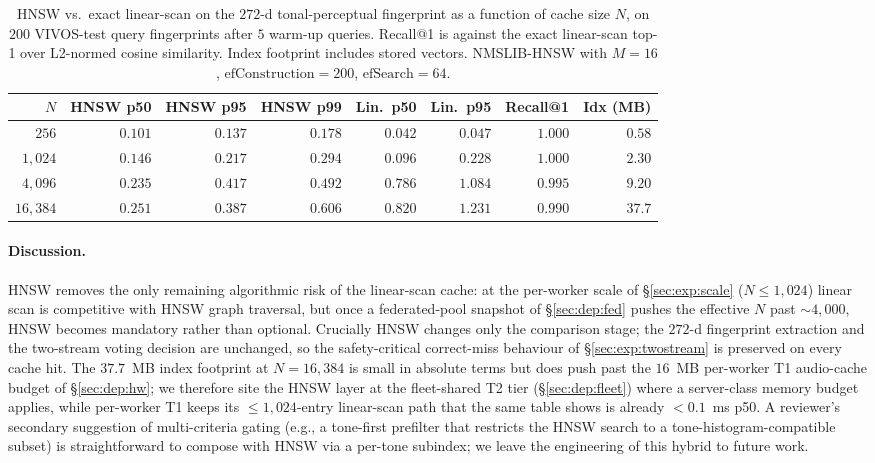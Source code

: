 \documentclass[a4paper,fleqn]{cas-dc}
\begin{document}
\begin{table}[h]
\caption{HNSW vs.\ exact linear-scan on the $272$-d tonal-perceptual fingerprint as a function of cache size $N$, on $200$ VIVOS-test query fingerprints after $5$ warm-up queries. Recall@1 is against the exact linear-scan top-1 over L2-normed cosine similarity. Index footprint includes stored vectors. NMSLIB-HNSW with $M=16$, $\mathrm{efConstruction}=200$, $\mathrm{efSearch}=64$.}\label{tab:hnsw_scaling}
\centering\footnotesize
\setlength{\tabcolsep}{4pt}
\begin{tabular}{rrrrrrrr}
\toprule
$N$ & HNSW p50 & HNSW p95 & HNSW p99 & Lin.\ p50 & Lin.\ p95 & Recall@1 & Idx (MB) \\
\midrule
$256$    & $0.101$ & $0.137$ & $0.178$ & $0.042$ & $0.047$ & $1.000$ & $0.58$ \\
$1{,}024$  & $0.146$ & $0.217$ & $0.294$ & $0.096$ & $0.228$ & $1.000$ & $2.30$ \\
$4{,}096$  & $0.235$ & $0.417$ & $0.492$ & $0.786$ & $1.084$ & $0.995$ & $9.20$ \\
$16{,}384$ & $\mathbf{0.251}$ & $0.387$ & $0.606$ & $0.820$ & $1.231$ & $\mathbf{0.990}$ & $37.7$ \\
\bottomrule
\end{tabular}
\end{table}

\paragraph{Discussion.} HNSW removes the only remaining algorithmic risk of the linear-scan cache: at the per-worker scale of \S\ref{sec:exp:scale} ($N \leq 1{,}024$) linear scan is competitive with HNSW graph traversal, but once a federated-pool snapshot of \S\ref{sec:dep:fed} pushes the effective $N$ past $\sim 4{,}000$, HNSW becomes mandatory rather than optional. Crucially HNSW changes only the comparison stage; the $272$-d fingerprint extraction and the two-stream voting decision are unchanged, so the safety-critical correct-miss behaviour of \S\ref{sec:exp:twostream} is preserved on every cache hit. The $37.7$~MB index footprint at $N=16{,}384$ is small in absolute terms but does push past the $16$~MB per-worker T1 audio-cache budget of \S\ref{sec:dep:hw}; we therefore site the HNSW layer at the fleet-shared T2 tier (\S\ref{sec:dep:fleet}) where a server-class memory budget applies, while per-worker T1 keeps its $\leq 1{,}024$-entry linear-scan path that the same table shows is already $< 0.1$~ms p50. A reviewer's secondary suggestion of multi-criteria gating (e.g., a tone-first prefilter that restricts the HNSW search to a tone-histogram-compatible subset) is straightforward to compose with HNSW via a per-tone subindex; we leave the engineering of this hybrid to future work.
\end{document}
